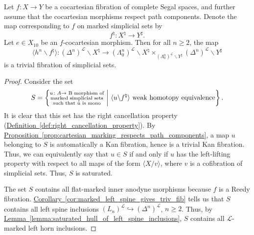 \documentclass[main.tex]{subfiles}
\begin{document}
\begin{proposition}
  \label{prop:segal_cocartesian_morphisms_are_quasicategory_cocartesian}
  Let $f\colon X \to Y$ be a cocartesian fibration of complete Segal spaces, and further assume that the cocartesian morphisms respect path components. Denote the map corresponding to $f$ on marked simplicial sets by
  \begin{equation*}
    f^{\natural}\colon X^{\natural} \to Y^{\sharp}.
  \end{equation*}
  Let $e \in X_{10}$ be an $f$-cocartesian morphism. Then for all $n \geq 2$, the map
  \begin{equation*}
    \langle h^{n} \backslash f^{\natural} \rangle\colon (\Delta^{n})^{\mathcal{L}} \backslash X^{\natural} \to (\Lambda^{n}_{0})^{\mathcal{L}} \backslash X^{\natural} \times_{(\Lambda^{n}_{0})^{\mathcal{L}} \backslash Y^{\sharp}} (\Delta^{n})^{\mathcal{L}} \backslash Y^{\sharp}
  \end{equation*}
  is a trivial fibration of simplicial sets.
\end{proposition}
\begin{proof}
  Consider the set
  \begin{equation*}
    S =
    \left\{
      \substack{
        u\colon A \to \text{ B morphism of} \\
        \text{marked simplicial sets} \\
        \text{such that $\mathring{u}$ is mono}
      }
      \ \bigg| \
      \langle u \backslash f^{\natural} \rangle \text{ weak homotopy equivalence}
    \right\}.
  \end{equation*}
  It is clear that this set has the right cancellation property (\hyperref[def:right_cancellation_property]{Definition~\ref*{def:right_cancellation_property}}). By \hyperref[prop:cartesian_marking_respects_path_components]{Proposition~\ref*{prop:cartesian_marking_respects_path_components}}, a map $u$ belonging to $S$ is automatically a Kan fibration, hence is a trivial Kan fibration. Thus, we can equivalently say that $u \in S$ if and only if $u$ has the left-lifting property with respect to all maps of the form $\langle X / v \rangle$, where $v$ is a cofibration of simplicial sets. Thus, $S$ is saturated.

  The set $S$ contains all flat-marked inner anodyne morphisms because $f$ is a Reedy fibration. \hyperref[cor:marked_left_spine_gives_triv_fib]{Corollary~\ref*{cor:marked_left_spine_gives_triv_fib}} tells us that $S$ contains all left spine inclusions $(L_{n})^{\mathcal{L}} \hookrightarrow (\Delta^{n})^{\mathcal{L}}$, $n \geq 2$. Thus, by \hyperref[lemma:saturated_hull_of_left_spine_inclusions]{Lemma~\ref*{lemma:saturated_hull_of_left_spine_inclusions}}, $S$ contains all $\mathcal{L}$-marked left horn inclusions.
\end{proof}
\end{document}
